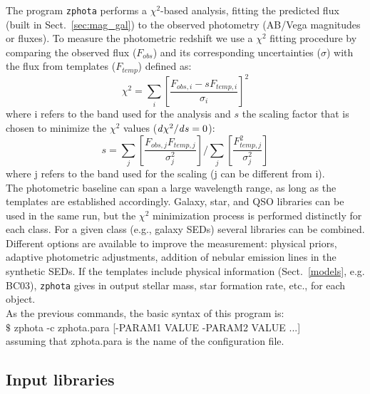 \documentclass[12pt]{article}
\begin{document}

The program \texttt{zphota} performs a $\chi^2$-based analysis, fitting the predicted flux (built in Sect.~\ref{sec:mag_gal}) to the observed photometry (AB/Vega magnitudes or fluxes). 
To measure the photometric redshift we use a $\chi^2$ fitting procedure by comparing the observed flux ($F_{obs}$) and its corresponding uncertainties ($\sigma$) with the flux from  templates ($F_{temp}$) 
 defined as:
 \[ \chi^2 =   \sum_i [ \frac{F_{obs,i} - s F_{temp,i}}{\sigma_i}]^2  \]
 where i refers to the band used for the analysis and $s$ the scaling factor that is chosen to minimize the $\chi^2$ values (${\it d}\chi^2/{\it d}s=0 $):
  \[   s =   \sum_j [ \frac{F_{obs,j}  F_{temp,j}}{\sigma_j^2} ]  / \sum_j [ \frac{F_{temp,j}^2}{ \sigma_j^2}] \]
where j refers to the band used for the scaling (j can be different from i).\\

The photometric baseline can span a large wavelength range, as long as the templates are established accordingly. Galaxy, star, and QSO libraries can be used in the same run, but the $\chi^2$ minimization process is performed distinctly for each class. For a given class (e.g., galaxy SEDs) several libraries can be combined. \\

Different options are available to improve  the \zphot  measurement: physical priors, adaptive photometric adjustments, addition of nebular emission lines in the synthetic SEDs. If the templates include physical information (Sect.~\ref{models}, e.g. BC03), \texttt{zphota} gives in output stellar mass, star formation rate, etc., for each object. \\
 
 As the previous commands, the basic syntax of this program is:\\
 $\$$ zphota -c  zphota.para [-PARAM1 VALUE  -PARAM2 VALUE ...]\\
 assuming that zphota.para is the name of the configuration file. 
 
 
\subsection{Input libraries}\label{lib}
\end{document}
